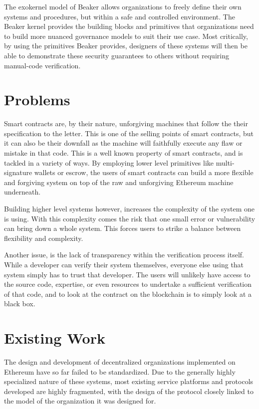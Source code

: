 \documentclass[english,a4paper]{article}
\begin{document}
The exokernel model of Beaker allows organizations to freely define
their own systems and procedures, but within a safe and controlled
environment. The Beaker kernel provides the building blocks and
primitives that organizations need to build more nuanced governance
models to suit their use case. Most critically, by using the primitives
Beaker provides, designers of these systems will then be able to
demonstrate these security guarantees to others without requiring
manual-code verification.

\section{Problems}\label{problems}

Smart contracts are, by their nature, unforgiving machines that follow
the their specification to the letter. This is one of the selling points
of smart contracts, but it can also be their downfall as the machine
will faithfully execute any flaw or mistake in that code. This is a well
known property of smart contracts, and is tackled in a variety of ways.
By employing lower level primitives like multi-signature wallets or
escrow, the users of smart contracts can build a more flexible and
forgiving system on top of the raw and unforgiving Ethereum machine
underneath.

Building higher level systems however, increases the complexity of the
system one is using. With this complexity comes the risk that one small
error or vulnerability can bring down a whole system. This forces users
to strike a balance between flexibility and complexity.

Another issue, is the lack of transparency within the verification
process itself. While a developer can verify their system themselves,
everyone else using that system simply has to trust that developer. The
users will unlikely have access to the source code, expertise, or even
resources to undertake a sufficient verification of that code, and to
look at the contract on the blockchain is to simply look at a black box.

\section{Existing Work}\label{existing-work}

The design and development of decentralized organizations implemented on
Ethereum have so far failed to be standardized. Due to the generally
highly specialized nature of these systems, most existing service
platforms and protocols developed are highly fragmented, with the design
of the protocol closely linked to the model of the organization it was
designed for.
\end{document}
